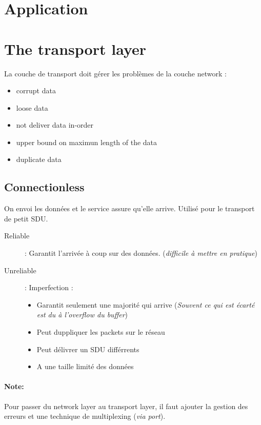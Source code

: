 \documentclass{report}
\begin{document}
\section{Application}


\section{The transport layer}

La couche de transport doit gérer les problèmes de la couche network :
\begin{itemize}
    \item corrupt data
    \item loose data
    \item not deliver data in-order
    \item upper bound on maximun length of the data
    \item duplicate data
\end{itemize}

\subsection{Connectionless}
On envoi les données et le service assure qu'elle arrive.
Utilisé pour le transport de petit SDU.

\begin{description}
    \item[Reliable] : Garantit l'arrivée à coup sur des données. (\textit{difficile à mettre en pratique})
    \item[Unreliable] : Imperfection :
        \begin{itemize}
            \item Garantit seulement une majorité qui arrive (\textit{Souvent ce qui est écarté est du à l'overflow du buffer})
            \item Peut duppliquer les packets sur le réseau
            \item Peut délivrer un SDU différrents
            \item A une taille limité des données
        \end{itemize}
\end{description}

\paragraph{Note:} Pour passer du network layer au transport layer, il faut ajouter la 
gestion des erreurs et une technique de multiplexing (\textit{via port}).
\end{document}
